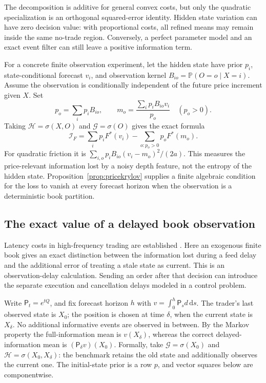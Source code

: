\documentclass[11pt]{article}
\theoremstyle{plain}
\theoremstyle{definition}
\theoremstyle{remark}
\newcommand{\dd}{\,\mathrm d}
\begin{document}
The decomposition is additive for general convex costs, but only
the quadratic specialization is an orthogonal squared-error
identity. Hidden state variation can have zero decision value:
with proportional costs, all refined means may remain inside the
same no-trade region. Conversely, a perfect parameter model and
an exact event filter can still leave a positive information term.

For a concrete finite observation experiment, let the hidden state
have prior \(p_i\), state-conditional forecast \(v_i\), and
observation kernel \(B_{io}=\mathbb P(O=o\mid X=i)\). Assume
the observation is conditionally independent of the future price
increment given \(X\). Set
\[
 p_o=\sum_i p_iB_{io},\qquad
 m_o=\frac{\sum_i p_iB_{io}v_i}{p_o}\quad(p_o>0).
\]
Taking \(\mathcal H=\sigma(X,O)\) and \(\mathcal G=\sigma(O)\)
gives the exact formula
\begin{equation}\label{eq:finiteobservationvalue}
 \mathcal I_F
 =\sum_i p_iF^*(v_i)-\sum_{o:p_o>0}p_oF^*(m_o).
\end{equation}
For quadratic friction it is
\(\sum_{i,o}p_iB_{io}(v_i-m_o)^2/(2a)\).
This measures the price-relevant information lost by a noisy
depth feature, not the entropy of the hidden state.
Proposition~\ref{prop:pricekrylov} supplies a finite algebraic
condition for the loss to vanish at every forecast horizon
when the observation is a deterministic book partition.


\subsection{The exact value of a delayed book observation}
\label{sec:feedlatency}

Latency costs in high-frequency trading are established
\citep{MoallemiSaglam2013}. Here an exogenous finite book gives an
exact distinction between the information lost during a feed delay
and the additional error of treating a stale state as current.
This is an observation-delay calculation. Sending an order after
that decision can introduce the separate execution and cancellation
delays modeled in a control problem.

Write \(\mathsf P_t=e^{tQ}\), and fix forecast horizon \(h\) with
\(v=\int_0^h\mathsf P_s d\dd s\).
The trader's last observed state is \(X_0\); the position is chosen
at time \(\delta\), when the current state is \(X_\delta\).
No additional informative events are observed in between. By the
Markov property the full-information mean is \(v(X_\delta)\),
whereas the correct delayed-information mean is
\((\mathsf P_\delta v)(X_0)\).
Formally, take \(\mathcal G=\sigma(X_0)\) and
\(\mathcal H=\sigma(X_0,X_\delta)\): the benchmark retains
the old state and additionally observes the current one.
The initial-state prior is a row \(p\), and vector squares below
are componentwise.
\end{document}
